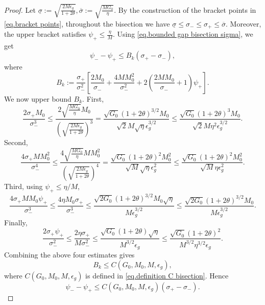 \documentclass{article}
\begin{document}
\begin{proof}
    Let
    \(
    \underline{\sigma}
    :=
    \sqrt{\frac{2M\epsilon_g}{1+2\theta}},
    \overline{\sigma}
    :=
    \sqrt{\frac{MG_0}{\eta}}.
    \)
    By the construction of the bracket points in \eqref{eq.bracket points},
    throughout the bisection we have
    \(
    \underline{\sigma}
    \le
    \sigma_-
    \le
    \sigma_+
    \le
    \overline{\sigma}.
    \)
    Moreover, the upper bracket satisfies
    \(
    \psi_+\le \frac{\eta}{M}.
    \)
    Using \eqref{eq.bounded gap bisection sigma}, we get
    \[
        \psi_- - \psi_+
        \le
        B_k(\sigma_+-\sigma_-),
    \]
    where
    \[
        B_k
        :=
        \frac{\sigma_+}{\sigma_-^2}
        \left[
            \frac{2M_0}{\sigma_-}
            +
            \frac{4MM_0^2}{\sigma_-^2}
            +
            2\left(
            \frac{2MM_0}{\sigma_-}+1
            \right)\psi_+
            \right].
    \]
    We now upper bound \(B_k\). First,
    \[
        \frac{2\sigma_+M_0}{\sigma_-^3}
        \le
        \frac{
            2\sqrt{\frac{MG_0}{\eta}}M_0
        }{
            \left(
            \sqrt{\frac{2M\epsilon_g}{1+2\theta}}
            \right)^3
        }  =
        \frac{
            \sqrt{G_0}(1+2\theta)^{3/2}M_0
        }{
            \sqrt{2}M\sqrt{\eta}\epsilon_g^{3/2}
        } \le
        \frac{
            \sqrt{G_0}(1+2\theta)^3M_0
        }{
            \sqrt{2}M\eta^2\epsilon_g^{3/2}
        }.
    \]
    Second,
    \[
        \frac{4\sigma_+MM_0^2}{\sigma_-^4}
        \le
        \frac{
            4\sqrt{\frac{MG_0}{\eta}}MM_0^2
        }{
            \left(
            \sqrt{\frac{2M\epsilon_g}{1+2\theta}}
            \right)^4
        } =
        \frac{
            \sqrt{G_0}(1+2\theta)^2M_0^2
        }{
            \sqrt{M}\sqrt{\eta}\epsilon_g^2
        } \le
        \frac{
            \sqrt{G_0}(1+2\theta)^2M_0^2
        }{
            \sqrt{M}\eta\epsilon_g^2
        }.
    \]
    Third, using \(\psi_+\le \eta/M\),
    \[
        \frac{4\sigma_+MM_0\psi_+}{\sigma_-^3}
        \le
        \frac{4\eta M_0\sigma_+}{\sigma_-^3} \le
        \frac{
            \sqrt{2G_0}(1+2\theta)^{3/2}M_0\sqrt{\eta}
        }{
            M\epsilon_g^{3/2}
        } \le
        \frac{
            \sqrt{2G_0}(1+2\theta)^{3/2}M_0
        }{
            M\epsilon_g^{3/2}
        }.
    \]
    Finally,
    \[
        \frac{2\sigma_+\psi_+}{\sigma_-^2}
        \le
        \frac{2\eta\sigma_+}{M\sigma_-^2} \le
        \frac{
            \sqrt{G_0}(1+2\theta)\sqrt{\eta}
        }{
            M^{3/2}\epsilon_g
        } \le
        \frac{
            \sqrt{G_0}(1+2\theta)^2
        }{
            M^{3/2}\eta^{3/2}\epsilon_g
        }.
    \]
    Combining the above four estimates gives
    \[
        B_k
        \le
        C(G_0,M_0,M,\epsilon_g),
    \]
    where \(C(G_0,M_0,M,\epsilon_g)\) is defined in
    \eqref{eq.definition C bisection}. Hence
    \[
        \psi_- - \psi_+
        \le
        C(G_0,M_0,M,\epsilon_g)(\sigma_+-\sigma_-).
    \]


\end{proof}
\end{document}
